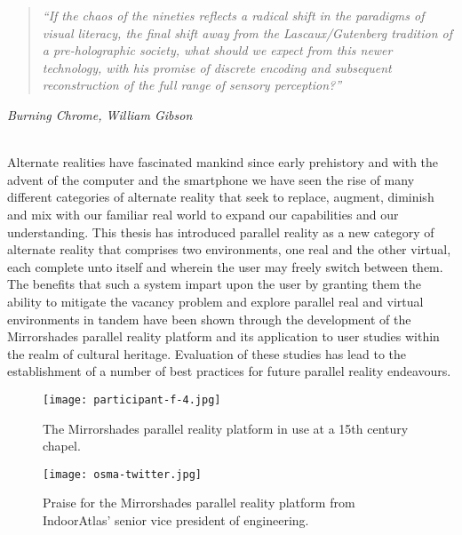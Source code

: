 \begin{quote}
	\textit{``If the chaos of the nineties reflects a radical shift in the paradigms of visual literacy, the final shift away from the Lascaux/Gutenberg tradition of a pre-holographic society, what should we expect from this newer technology, with his promise of discrete encoding and subsequent reconstruction of the full range of sensory perception?''}
\end{quote}
\hfill \textit{Burning Chrome, William Gibson}
\\
\\


\label{chapter-conclusions}

Alternate realities have fascinated mankind since early prehistory and with the advent of the computer and the smartphone we have seen the rise of many different categories of alternate reality that seek to replace, augment, diminish and mix with our familiar real world to expand our capabilities and our understanding. This thesis has introduced parallel reality as a new category of alternate reality that comprises two environments, one real and the other virtual, each complete unto itself and wherein the user may freely switch between them. The benefits that such a system impart upon the user by granting them the ability to mitigate the vacancy problem and explore parallel real and virtual environments in tandem have been shown through the development of the Mirrorshades parallel reality platform and its application to user studies within the realm of cultural heritage. Evaluation of these studies has lead to the establishment of a number of best practices for future parallel reality endeavours.

\begin{figure}[t]
	\begin{center}
		\texttt{[image: participant-f-4.jpg]}
		\caption{The Mirrorshades parallel reality platform in use at a 15th century chapel.}
		\label{participant-f-4.jpg}
	\end{center}	
\end{figure}

\begin{figure}[t]
	\begin{center}
		\texttt{[image: osma-twitter.jpg]}
		\caption{Praise for the Mirrorshades parallel reality platform from IndoorAtlas' senior vice president of engineering.}
		\label{osma-twitter.jpg}
	\end{center}	
\end{figure}

